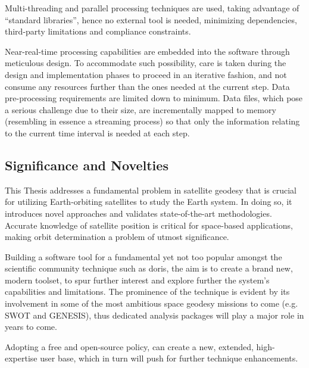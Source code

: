 Multi-threading and parallel processing techniques are used, taking advantage of 
``standard libraries'', hence no external tool is needed, minimizing dependencies, 
third-party limitations and compliance constraints.

Near-real-time processing capabilities are embedded into the software through 
meticulous design. To accommodate such possibility, care is taken during the 
design and implementation phases to proceed in an iterative fashion, and not 
consume any resources further than the ones needed at the current step. Data 
pre-processing requirements are limited down to minimum. Data files, which pose a 
serious challenge due to their size, are incrementally mapped to memory (resembling 
in essence a streaming process) so that only the information relating to the 
current time interval is needed at each step.

\subsection{Significance and Novelties}\label{ssec:significance-and-novelty}
\iffalse
This Thesis touches upon a fundamental problem of satellite geodesy, one that sits 
in the core of using Earth orbiting satellites to study the Earth system, introducing 
on the way novel approaches, and validating state-of-the-art methodologies.
Since, accurate knowledge of satellite position is an essential and imperative need 
for space based application, orbit determination is a problem of utmost significance. 
\fi
This Thesis addresses a fundamental problem in satellite geodesy that is crucial
for utilizing Earth-orbiting satellites to study the Earth system. In doing so, it
introduces novel approaches and validates state-of-the-art methodologies. Accurate
knowledge of satellite position is critical for space-based applications, making
orbit determination a problem of utmost significance.

Building a software tool for a fundamental yet not too popular amongst the 
scientific community technique such as \gls{doris}, the aim is to create a brand new, 
modern toolset, to spur further interest and explore further the system's 
capabilities and limitations. The prominence of the technique is evident by its 
involvement in some of the most ambitious space geodesy missions to come (e.g. 
SWOT and GENESIS), thus dedicated analysis packages will play a major role in 
years to come.

Adopting a free and open-source policy, can create a new, extended, high-expertise 
user base, which in turn will push for further technique enhancements.

